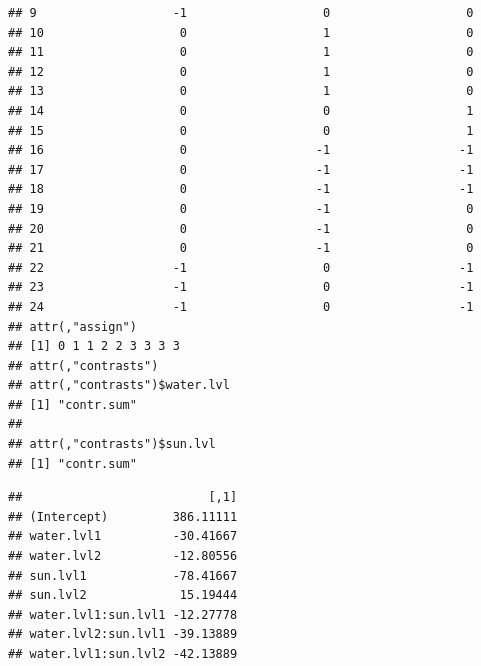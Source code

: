 \documentclass[
]{book}
\newenvironment{Shaded}{\begin{snugshade}}{\end{snugshade}}
\newcommand{\DecValTok}[1]{\textcolor[rgb]{0.00,0.00,0.81}{#1}}
\newcommand{\FunctionTok}[1]{\textcolor[rgb]{0.00,0.00,0.00}{#1}}
\newcommand{\NormalTok}[1]{#1}
\newcommand{\OtherTok}[1]{\textcolor[rgb]{0.56,0.35,0.01}{#1}}
\newcommand{\SpecialCharTok}[1]{\textcolor[rgb]{0.00,0.00,0.00}{#1}}
\begin{document}
\begin{verbatim}
## 9                   -1                   0                   0
## 10                   0                   1                   0
## 11                   0                   1                   0
## 12                   0                   1                   0
## 13                   0                   1                   0
## 14                   0                   0                   1
## 15                   0                   0                   1
## 16                   0                  -1                  -1
## 17                   0                  -1                  -1
## 18                   0                  -1                  -1
## 19                   0                  -1                   0
## 20                   0                  -1                   0
## 21                   0                  -1                   0
## 22                  -1                   0                  -1
## 23                  -1                   0                  -1
## 24                  -1                   0                  -1
## attr(,"assign")
## [1] 0 1 1 2 2 3 3 3 3
## attr(,"contrasts")
## attr(,"contrasts")$water.lvl
## [1] "contr.sum"
## 
## attr(,"contrasts")$sun.lvl
## [1] "contr.sum"
\end{verbatim}

\begin{Shaded}
\end{Shaded}

\begin{verbatim}
##                          [,1]
## (Intercept)         386.11111
## water.lvl1          -30.41667
## water.lvl2          -12.80556
## sun.lvl1            -78.41667
## sun.lvl2             15.19444
## water.lvl1:sun.lvl1 -12.27778
## water.lvl2:sun.lvl1 -39.13889
## water.lvl1:sun.lvl2 -42.13889
\end{verbatim}

\begin{Shaded}
\end{Shaded}
\end{document}
